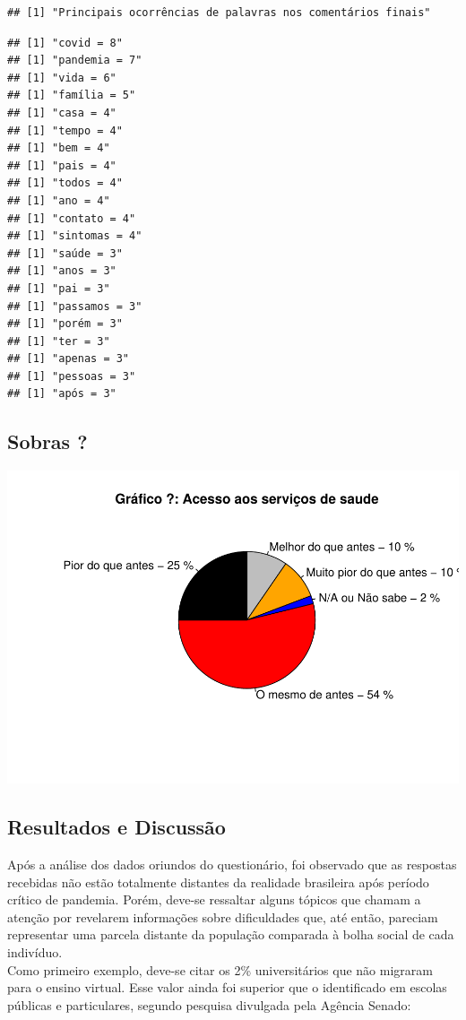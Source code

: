 \documentclass[
]{article}
\begin{document}
\begin{verbatim}
## [1] "Principais ocorrências de palavras nos comentários finais"
\end{verbatim}

\begin{verbatim}
## [1] "covid = 8"
## [1] "pandemia = 7"
## [1] "vida = 6"
## [1] "família = 5"
## [1] "casa = 4"
## [1] "tempo = 4"
## [1] "bem = 4"
## [1] "pais = 4"
## [1] "todos = 4"
## [1] "ano = 4"
## [1] "contato = 4"
## [1] "sintomas = 4"
## [1] "saúde = 3"
## [1] "anos = 3"
## [1] "pai = 3"
## [1] "passamos = 3"
## [1] "porém = 3"
## [1] "ter = 3"
## [1] "apenas = 3"
## [1] "pessoas = 3"
## [1] "após = 3"
\end{verbatim}

\hypertarget{sobras}{%
\subsection{Sobras ?}\label{sobras}}

\includegraphics{consequencias-oriundas-da-pandemia-v1.0_files/figure-latex/grafico-nana-1.pdf}

\hypertarget{resultados-e-discussuxe3o}{%
\subsection{Resultados e Discussão}\label{resultados-e-discussuxe3o}}

Após a análise dos dados oriundos do questionário, foi observado que as
respostas recebidas não estão totalmente distantes da realidade
brasileira após período crítico de pandemia. Porém, deve-se ressaltar
alguns tópicos que chamam a atenção por revelarem informações sobre
dificuldades que, até então, pareciam representar uma parcela distante
da população comparada à bolha social de cada indivíduo.\\
Como primeiro exemplo, deve-se citar os 2\% universitários que não
migraram para o ensino virtual. Esse valor ainda foi superior que o
identificado em escolas públicas e particulares, segundo pesquisa
divulgada pela Agência Senado:
\end{document}
